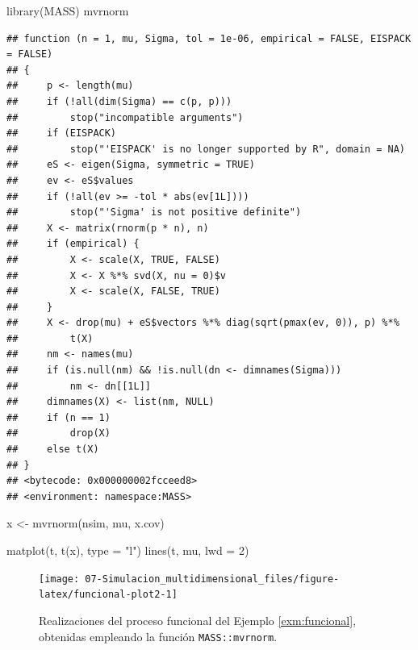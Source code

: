 \documentclass[
]{book}
\newenvironment{Shaded}{\begin{snugshade}}{\end{snugshade}}
\newcommand{\AttributeTok}[1]{\textcolor[rgb]{0.77,0.63,0.00}{#1}}
\newcommand{\DecValTok}[1]{\textcolor[rgb]{0.00,0.00,0.81}{#1}}
\newcommand{\FunctionTok}[1]{\textcolor[rgb]{0.00,0.00,0.00}{#1}}
\newcommand{\NormalTok}[1]{#1}
\newcommand{\OtherTok}[1]{\textcolor[rgb]{0.56,0.35,0.01}{#1}}
\newcommand{\StringTok}[1]{\textcolor[rgb]{0.31,0.60,0.02}{#1}}
\theoremstyle{break}
\theoremstyle{definition}
\theoremstyle{definition}
\theoremstyle{definition}
\theoremstyle{definition}
\theoremstyle{remark}
\begin{document}
\begin{Shaded}
\begin{Highlighting}[]
\FunctionTok{library}\NormalTok{(MASS)}
\NormalTok{mvrnorm}
\end{Highlighting}
\end{Shaded}

\begin{verbatim}
## function (n = 1, mu, Sigma, tol = 1e-06, empirical = FALSE, EISPACK = FALSE) 
## {
##     p <- length(mu)
##     if (!all(dim(Sigma) == c(p, p))) 
##         stop("incompatible arguments")
##     if (EISPACK) 
##         stop("'EISPACK' is no longer supported by R", domain = NA)
##     eS <- eigen(Sigma, symmetric = TRUE)
##     ev <- eS$values
##     if (!all(ev >= -tol * abs(ev[1L]))) 
##         stop("'Sigma' is not positive definite")
##     X <- matrix(rnorm(p * n), n)
##     if (empirical) {
##         X <- scale(X, TRUE, FALSE)
##         X <- X %*% svd(X, nu = 0)$v
##         X <- scale(X, FALSE, TRUE)
##     }
##     X <- drop(mu) + eS$vectors %*% diag(sqrt(pmax(ev, 0)), p) %*% 
##         t(X)
##     nm <- names(mu)
##     if (is.null(nm) && !is.null(dn <- dimnames(Sigma))) 
##         nm <- dn[[1L]]
##     dimnames(X) <- list(nm, NULL)
##     if (n == 1) 
##         drop(X)
##     else t(X)
## }
## <bytecode: 0x000000002fcceed8>
## <environment: namespace:MASS>
\end{verbatim}

\begin{Shaded}
\begin{Highlighting}[]
\NormalTok{x }\OtherTok{\textless{}{-}} \FunctionTok{mvrnorm}\NormalTok{(nsim, mu, x.cov)}

\FunctionTok{matplot}\NormalTok{(t, }\FunctionTok{t}\NormalTok{(x), }\AttributeTok{type =} \StringTok{"l"}\NormalTok{)}
\FunctionTok{lines}\NormalTok{(t, mu, }\AttributeTok{lwd =} \DecValTok{2}\NormalTok{)}
\end{Highlighting}
\end{Shaded}

\begin{figure}[!htb]

{\centering \texttt{[image: 07-Simulacion\_multidimensional\_files/figure-latex/funcional-plot2-1]} 

}

\caption{Realizaciones del proceso funcional del Ejemplo \ref{exm:funcional}, obtenidas empleando la función \texttt{MASS::mvrnorm}.}\label{fig:funcional-plot2}
\end{figure}
\end{document}
